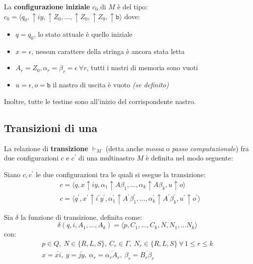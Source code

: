 \documentclass[italian, 10pt]{article}
\newcommand{\blank}{\texttt{b}} %
\begin{document}
La \textbf{configurazione iniziale} \(c_0\) di \(M\) è del tipo: \(c_0 = \langle q_0, \uparrow iy, \uparrow Z_0, \ldots, \uparrow Z_0, \uparrow Z_0, \uparrow \blank \rangle\)
dove:

\begin{itemize}
  \item \(q = q_0\), lo stato attuale è quello iniziale
  \item \(x = \epsilon\), nessun carattere della stringa è ancora stata letta
  \item \(A_r = Z_0, \alpha_r = \beta_r = \epsilon \ \forall r\), tutti i nastri di memoria sono vuoti
  \item \(u = \epsilon, o = \blank\) il nastro di uscita è vuoto \textit{(se definito)}
\end{itemize}

Inoltre, tutte le testine sono all'inizio del corrispondente nastro.

\subsection{Transizioni di una \TM}

La relazione di \textbf{transizione} \(\vdash_M\) (detta anche \textit{mossa} o \textit{passo computazionale}) fra due configurazioni \(c\) e \(c^\prime\) di una \TM multinastro \(M\) è definita nel modo seguente:

Siano \(c, c^\prime\) le due configurazioni tra le quali si esegue la transizione:
\begin{align*}
   & c = \langle q, x \uparrow iy, \alpha_1 \uparrow A \beta_1, \ldots, \alpha_k \uparrow A \beta_k, u \uparrow o \rangle                                                                                                 \\
   & c = \langle q^\prime , x^\prime  \uparrow i^\prime y^\prime , \alpha_1^\prime  \uparrow A^\prime  \beta_1^\prime , \ldots, \alpha_k^\prime  \uparrow A^\prime  \beta_k^\prime , u^\prime  \uparrow o^\prime  \rangle
\end{align*}

\smallskip

Sia \(\delta\) la funzione di transizione, definita come:
\[ \delta(q, i, A_1, \ldots, A_k) = \langle p, C_1, \ldots, C_k, N, N_1, \ldots N_k \rangle \]
con:
\begin{gather*}
  p \in Q , \  N \in \{R, L, S\} , \  C_r \in \Gamma , \  N_r \in \{R, L, S\} \ \forall \, 1 \leq r \leq k \\
  x = \overline{xi} , \  y = \overline{jy} , \  \alpha_r = \overline{\alpha_r A_r} , \  \beta_r = \overline{B_r \beta_r}
\end{gather*}
\end{document}
